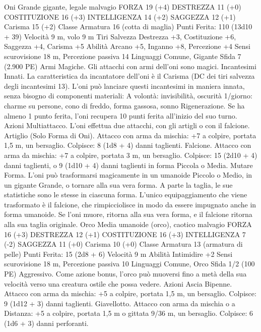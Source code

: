 \begin{multicols}{2}
Oni
Grande gigante, legale malvagio
FORZA 19 (+4)
DESTREZZA 11 (+0)
COSTITUZIONE 16 (+3)
INTELLIGENZA 14 (+2)
SAGGEZZA 12 (+1)
Carisma 15 (+2)
Classe Armatura 16 (cotta di maglia)
\hspace*{0pt}\hfill{Punti Ferita}: 110 (13d10 + 39)
Velocità 9 m, volo 9 m
Tiri Salvezza Destrezza +3, Costituzione +6, Saggezza +4,
Carisma +5
Abilità Arcano +5, Inganno +8, Percezione +4
Sensi scurovisione 18 m, Percezione passiva 14
Linguaggi Comune, Gigante
Sfida 7 (2.900 PE)
Armi Magiche. Gli attacchi con armi dell’oni sono magici.
Incantesimi Innati. La caratteristica da incantatore dell’oni è il
Carisma (DC dei tiri salvezza degli incantesimi 13). L’oni può
lanciare questi incantesimi in maniera innata, senza bisogno di
componenti materiali:
A volontà: invisibilità, oscurità
1/giorno: charme su persone, cono di freddo, forma gassosa,
sonno
Rigenerazione. Se ha almeno 1 punto ferita, l’oni recupera 10
punti ferita all’inizio del suo turno.
Azioni
Multiattacco. L’oni effettua due attacchi, con gli artigli o con il
falcione.
Artiglio (Solo Forma di Oni). Attacco con arma da mischia: +7
a colpire, portata 1,5 m, un bersaglio.
Colpisce: 8 (1d8 + 4) danni taglienti.
Falcione. Attacco con arma da mischia: +7 a colpire, portata 3
m, un bersaglio.
Colpisce: 15 (2d10 + 4) danni taglienti, o 9 (1d10 + 4) danni
taglienti in forma Piccola o Media.
Mutare Forma. L’oni può trasformarsi magicamente in un
umanoide Piccolo o Medio, in un gigante Grande, o tornare alla sua
vera forma. A parte la taglia, le sue statistiche sono le stesse in
ciascuna forma. L’unico equipaggiamento che viene trasformato è il
falcione, che rimpicciolisce in modo da essere impugnato anche in
forma umanoide. Se l’oni muore, ritorna alla sua vera forma, e il
falcione ritorna alla sua taglia originale.
Orco
Media umanoide (orco), caotico malvagio
FORZA 16 (+3)
DESTREZZA 12 (+1)
COSTITUZIONE 16 (+3)
INTELLIGENZA 7 (-2)
SAGGEZZA 11 (+0)
Carisma 10 (+0)
Classe Armatura 13 (armatura di pelle)
\hspace*{0pt}\hfill{Punti Ferita}: 15 (2d8 + 6)
Velocità 9 m
Abilità Intimidire +2
Sensi scurovisione 18 m, Percezione passiva 10
Linguaggi Comune, Orco
Sfida 1/2 (100 PE)
Aggressivo. Come azione bonus, l’orco può muoversi fino a
metà della sua velocità verso una creatura ostile che possa
vedere.
Azioni
Ascia Bipenne. Attacco con arma da mischia: +5 a colpire,
portata 1,5 m, un bersaglio.
Colpisce: 9 (1d12 + 3) danni taglienti.
Giavellotto. Attacco con arma da mischia o a Distanza: +5 a
colpire, portata 1,5 m o gittata 9/36 m, un bersaglio.
Colpisce: 6 (1d6 + 3) danni perforanti.

\end{multicols}
